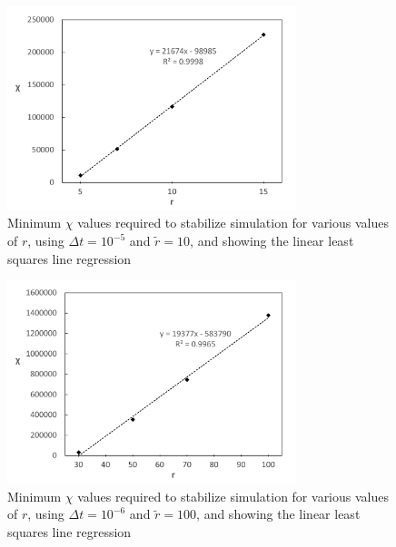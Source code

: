 \begin{figure}[!tb]
\centering
\includegraphics[width=0.75\textwidth]{figures/min_chi_dt5_r10.pdf}
\caption{Minimum $\chi$ values required to stabilize simulation for various values of $r$, using $\Delta t=10^{-5}$ and $\tilde{r}=10$, and showing the linear least squares line regression}
\label{fig:min_chi_dt5_r10}
\end{figure}

\begin{figure}[!tb]
\centering
\includegraphics[width=0.75\textwidth]{figures/min_chi_dt6_r100.pdf}
\caption{Minimum $\chi$ values required to stabilize simulation for various values of $r$, using $\Delta t=10^{-6}$ and $\tilde{r}=100$, and showing the linear least squares line regression}
\label{fig:min_chi_dt6_r100}
\end{figure}
